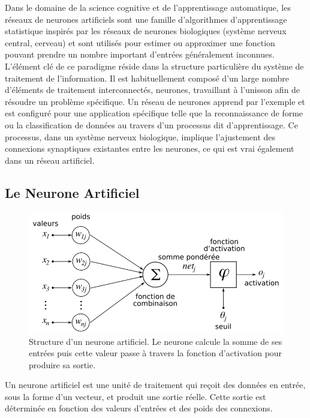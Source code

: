 Dans le domaine de la science cognitive et de l'apprentissage automatique, les réseaux de neurones artificiels sont une famille d'algorithmes d'apprentissage statistique inspirés par les réseaux de neurones biologiques (système nerveux central, cerveau) et sont utilisés pour estimer ou approximer une fonction pouvant prendre un nombre important d'entrées généralement inconnues.\\

L'élément clé de ce paradigme réside dans la structure particulière du système de traitement de l'information. Il est habituellement composé d'un large nombre d'éléments de traitement interconnectés, neurones, travaillant à l’unisson afin de résoudre un problème spécifique. Un réseau de neurones apprend par l'exemple et est configuré pour une application spécifique telle que la reconnaissance de forme ou la classification de données au travers d'un processus dit d’apprentissage. Ce processus, dans un système nerveux biologique, implique l'ajustement des connexions synaptiques existantes entre les neurones, ce qui est vrai également dans un réseau artificiel.

   


\subsection{Le Neurone Artificiel}

\begin{figure}[H]
    \centering
    \includegraphics[width=\textwidth]{./pictures/800px-ArtificialNeuronModel_francais.png}
    \caption{Structure d'un neurone artificiel. Le neurone calcule la somme de ses entrées puis cette valeur passe à travers la fonction d'activation pour produire sa sortie.}
\end{figure}
Un neurone artificiel est une unité de traitement qui reçoit des données en entrée, sous la forme d’un vecteur, et produit une sortie réelle. Cette sortie est déterminée en fonction des valeurs d'entrées et des poids des connexions.\\


